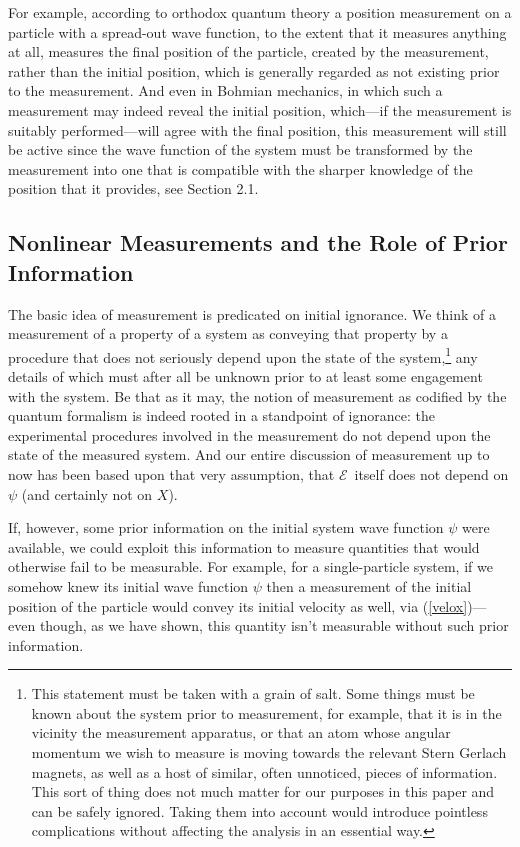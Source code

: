 \documentclass[12pt]{article}
\newcommand{\wf}{wave function}
\newcommand{\E}{\mbox{$\mathscr{E}$}}
\begin{document}
For example, according to orthodox quantum theory a position
measurement on a particle with a spread-out wave function, to the
extent that it measures anything at all, measures the final position
of the particle, created by the measurement, rather than the initial
position, which is generally regarded as not existing prior to the
measurement. And even in Bohmian mechanics, in which such a
measurement may indeed reveal the initial position, which---if the
measurement is suitably performed---will agree with the final
position, this measurement will still be active since the wave
function of the system must be transformed by the measurement into one
that is compatible with the sharper knowledge of the position that it
provides, see Section 2.1.


\subsection{Nonlinear Measurements and the Role of Prior Information}
\label{secnl}

The basic idea of measurement is predicated on initial ignorance. We
think of a measurement of a property of a system as conveying that
property by a procedure that does not seriously depend upon the state
of the system,\footnote{This statement must be taken with a grain of
   salt. Some things must be known about the system prior to
   measurement, for example, that it is in the vicinity the measurement
   apparatus, or that an atom whose angular momentum we wish to measure
   is moving towards the relevant Stern Gerlach magnets, as well as a
   host of similar, often unnoticed, pieces of information. This sort
   of thing does not much matter for our purposes in this paper and can
   be safely ignored. Taking them into account would introduce
   pointless complications without affecting the analysis in an
   essential way.} any details of which must after all be unknown prior
to at least some engagement with the system. Be that as it may, the
notion of measurement as codified by the quantum formalism is indeed
rooted in a standpoint of ignorance: the experimental procedures
involved in the measurement do not depend upon the state of the
measured system. And our entire discussion of measurement up to now
has been based upon that very assumption, that \E\ itself does not
depend on $\psi$ (and certainly not on $X$).

If, however, some prior information on the initial system wave
function $\psi$ were available, we could exploit this information to
measure quantities that would otherwise fail to be measurable. For
example, for a single-particle system, if we somehow knew its initial
\wf{} $\psi$ then a measurement of the initial position of the
particle would convey its initial velocity as well, via
(\ref{velox})---even though, as we have shown, this quantity isn't
measurable without such prior information.
\end{document}

